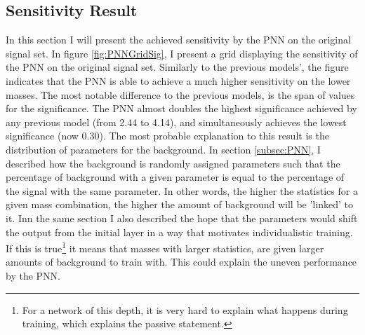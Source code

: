 \subsection{Sensitivity Result}
In this section I will present the achieved sensitivity by the \ac{PNN} on the original signal set. In figure \ref{fig:PNNGridSig}, I present a grid displaying the sensitivity 
of the \ac{PNN} on the original signal set. Similarly to the previous models', the figure indicates that the \ac{PNN} is able to achieve a much higher sensitivity on the lower
masses. The most notable difference to the previous models, is the span of values for the significance. The \ac{PNN} almost doubles the highest significance achieved by any previous model
(from 2.44 to 4.14), and simultaneously achieves the lowest significance (now 0.30). The most probable explanation to this result is the distribution of parameters for the background. 
In section \ref{subsec:PNN}, I described how the background is randomly assigned parameters such that the percentage of background with a given parameter is equal to the percentage 
of the signal with the same parameter. In other words, the higher the statistics for a given mass combination, the higher the amount of background will be 'linked' to it. Inn the 
same section I also described the hope that the parameters would shift the output from the initial layer in a way that motivates individualistic training. If this is 
true\footnote{For a network of this depth, it is very hard to explain what happens during training, which explains the passive statement.} it means that masses with larger statistics, 
are given larger amounts of background to train with. This could explain the uneven performance by the \ac{PNN}. \\
